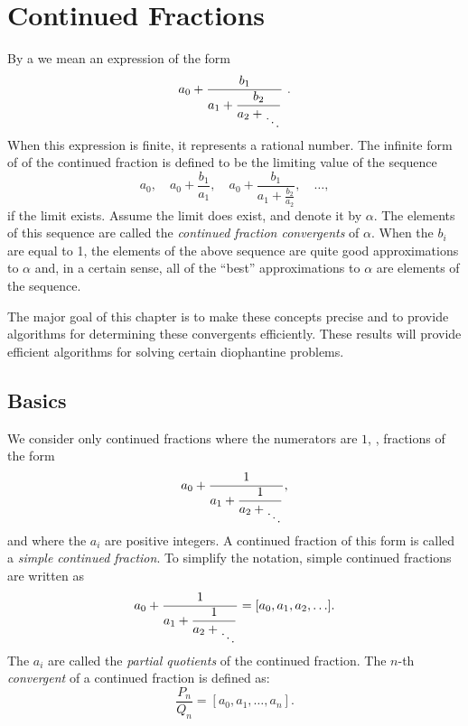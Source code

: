\chapter{Continued Fractions} 
\label{CF:Chap}

\def\Ddots{\mbox{\raisebox{-2ex}{$\ddots$}}}


By a  we mean an expression of the form
\[
a_0 + \frac{b_1}{\displaystyle a_1 + \frac{b_2}{\displaystyle a_2 + \Ddots}}\ .
\]
When this expression is finite, it represents a rational number. The
infinite form of of the continued fraction is defined to be the 
limiting value of the sequence 
\[
a_0, \quad a_0 + \frac{b_1}{a_1}, \quad 
a_0 + \frac{b_1}{\displaystyle a_1 + \frac{b_2}{a_2}}, \quad \ldots,
\]
if the limit exists.  Assume the limit does exist, and denote it by
$\alpha$.  The elements of this sequence are called the  
{\em continued fraction convergents} of $\alpha$.  When the $b_i$ are equal to 1, the 
elements of the above sequence are quite good approximations to
$\alpha$ and, in a certain sense, all of the ``best'' approximations
to $\alpha$ are elements of the sequence.

The major goal of this chapter is to make these concepts precise and
to provide algorithms for determining these convergents efficiently.
These results will provide efficient algorithms for solving certain
diophantine problems.

\section{Basics}
\label{CF:Basics:Sec}

We consider only continued fractions where the numerators are $1$,
\ie, fractions of the form
\[
a_0 + \frac{1}{\displaystyle a_1 + \frac{1}{a_2 + \Ddots}},
\]
and where the $a_i$ are positive integers.  A continued fraction of
this form is called a {\em simple continued
fraction\/}.  To simplify the
notation, simple continued fractions are written as
\[
a_0 + \frac{1}{\displaystyle a_1 + \frac{1}{a_2 + \Ddots}}
    = [a_0,a_1, a_2, \ldots].
\]
The $a_i$ are called the {\em partial quotients} of the continued fraction.  The $n$-th {\em
convergent} of a continued
fraction is defined as:
\[
\frac{P_n}{Q_n} = [a_0, a_1, \ldots, a_n].
\]

